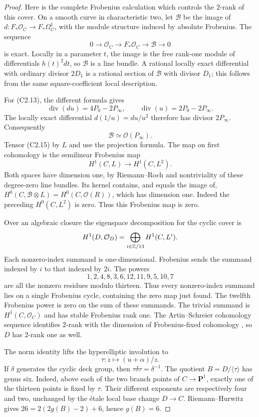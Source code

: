 \begin{proof}
Here is the complete Frobenius calculation which controls the
$2$-rank of this cover. On a smooth curve in characteristic two,
let $\mathcal B$ be the image of
$d:F_*\mathcal O_C\to F_*\Omega_C^1$, with the module structure
induced by absolute Frobenius. The sequence
\[
 0\longrightarrow\mathcal O_C\longrightarrow F_*\mathcal O_C
   \longrightarrow\mathcal B\longrightarrow0                \tag{C2.15}
\]
is exact. Locally in a parameter $t$, the image is the free
rank-one module of differentials $h(t)^2dt$, so $\mathcal B$
is a line bundle. A rational locally exact differential with
ordinary divisor $2D_1$ is a rational section of $\mathcal B$
with divisor $D_1$; this follows from the same square-coefficient
local description.

For (C2.13), the different formula gives
\[
 \operatorname{div}(du)=4P_0-2P_\infty,
 \qquad \operatorname{div}(u)=2P_0-2P_\infty.
\]
The locally exact differential $d(1/u)=du/u^2$ therefore has
divisor $2P_\infty$. Consequently
\[
                         \mathcal B\simeq\mathcal O(P_\infty).
\]
Tensor (C2.15) by $L$ and use the projection formula. The map
on first cohomology is the semilinear Frobenius map
\[
                   H^1(C,L)\longrightarrow H^1(C,L^2).
\]
Both spaces have dimension one, by Riemann--Roch and nontriviality
of these degree-zero line bundles. Its kernel contains, and equals
the image of, $H^0(C,\mathcal B\otimes L)=H^0(C,\mathcal O(R))$,
which has dimension one. Indeed the preceding $H^0(C,L^2)$
is zero. Thus this Frobenius map is zero.

Over an algebraic closure the eigenspace decomposition for the
cyclic cover is
\[
 H^1(D,\mathcal O_D)=\bigoplus_{i\in\mathbb Z/13}H^1(C,L^i).
\]
Each nonzero-index summand is one-dimensional. Frobenius sends
the summand indexed by $i$ to that indexed by $2i$. The powers
\[
                1,2,4,8,3,6,12,11,9,5,10,7
\]
are all the nonzero residues modulo thirteen. Thus every
nonzero-index summand lies on a single Frobenius cycle, containing
the zero map just found. The twelfth Frobenius power is zero on
the sum of these summands. The trivial summand is
$H^1(C,\mathcal O_C)$ and has stable Frobenius rank one.
The Artin--Schreier cohomology sequence identifies $2$-rank with
the dimension of Frobenius-fixed cohomology
\citep[Definition 1.1 and the following discussion]{A_Yang2016},
so $D$ has $2$-rank one as well.

The norm identity lifts the hyperelliptic involution to
\[
                  \tau:z\longmapsto (u+\alpha)/z.
\]
If $\delta$ generates the cyclic deck group, then
$\tau\delta\tau=\delta^{-1}$. The quotient $B=D/\langle\tau\rangle$
has genus six. Indeed, above each of the two branch points of
$C\to\mathbf P^1$, exactly one of the thirteen points is fixed
by $\tau$. Their different exponents are respectively four and
two, unchanged by the \'etale local base change
$D\to C$. Riemann--Hurwitz gives
$26=2(2g(B)-2)+6$, hence $g(B)=6$.


\end{proof}
